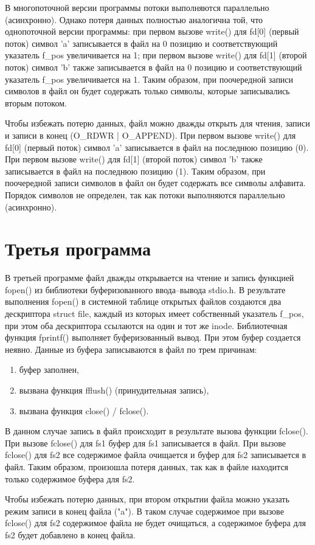 В многопоточной версии программы потоки выполняются параллельно (асинхронно).
Однако потеря данных полностью аналогична той, что однопоточной версии программы: при первом вызове write() для fd[0] (первый поток) символ 'a' записывается в файл на 0 позицию и соответствующий указатель f\_pos увеличивается на 1; при первом вызове write() для fd[1] (второй поток) символ 'b' также записывается в файл на 0 позицию и соответствующий указатель f\_pos увеличивается на 1.
Таким образом, при поочередной записи символов в файл он будет содержать только символы, которые записывались вторым потоком.

Чтобы избежать потерю данных, файл можно дважды открыть для чтения, записи и записи в конец (O\_RDWR | O\_APPEND).
При первом вызове write() для fd[0] (первый поток) символ 'a' записывается в файл на последнюю позицию (0).
При первом вызове write() для fd[1] (второй поток) символ 'b' также записывается в файл на последнюю позицию (1).
Таким образом, при поочередной записи символов в файл он будет содержать все символы алфавита.
Порядок символов не определен, так как потоки выполняются параллельно (асинхронно).

\clearpage

\section{Третья программа}



В третьей программе файл дважды открывается на чтение и запись функцией fopen() из библиотеки буферизованного ввода--вывода stdio.h.
В результате выполнения fopen() в системной таблице открытых файлов создаются два дескриптора struct file, каждый из которых имеет собственный указатель f\_pos, при этом оба дескриптора ссылаются на один и тот же inode.
Библиотечная функция fprintf() выполняет буферизованный вывод.
При этом буфер создается неявно.
Данные из буфера записываются в файл по трем причинам:

\begin{enumerate}
	\item буфер заполнен,
	\item вызвана функция fflush() (принудительная запись),
	\item вызвана функция close() / fclose().
\end{enumerate}

В данном случае запись в файл происходит в результате вызова функции fclose().
При вызове fclose() для fs1 буфер для fs1 записывается в файл.
При вызове fclose() для fs2 все содержимое файла очищается и буфер для fs2 записывается в файл.
Таким образом, произошла потеря данных, так как в файле находится только содержимое буфера для fs2.

Чтобы избежать потерю данных, при втором открытии файла можно указать режим записи в конец файла ("a").
В таком случае содержимое при вызове fclose() для fs2 содержимое файла не будет очищаться, а содержимое буфера для fs2 будет добавлено в конец файла.


